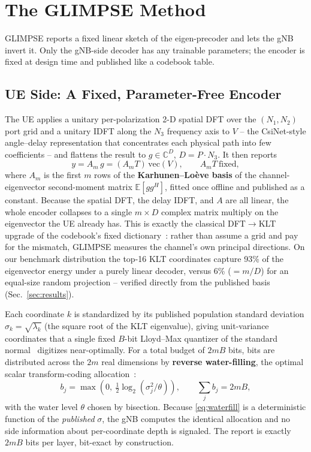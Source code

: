 \documentclass[conference]{IEEEtran}
\begin{document}
\section{The GLIMPSE Method}
GLIMPSE reports a fixed linear sketch of the eigen-precoder and lets the gNB invert it. Only the gNB-side decoder has any trainable parameters; the encoder is fixed at design time and published like a codebook table.

\subsection{UE Side: A Fixed, Parameter-Free Encoder}
The UE applies a unitary per-polarization 2-D spatial DFT over the $(N_1,N_2)$ port grid and a unitary IDFT along the $N_3$ frequency axis to $V$ -- the CsiNet-style angle--delay representation that concentrates each physical path into few coefficients -- and flattens the result to $g\in\mathbb{C}^D$, $D=P\cdot N_3$. It then reports
\begin{equation}
y = A_m\,g = (A_m T)\,\mathrm{vec}(V), \qquad A_m T\ \text{fixed},
\label{eq:report}
\end{equation}
where $A_m$ is the first $m$ rows of the \textbf{Karhunen--Lo\`{e}ve basis} of the channel-eigenvector second-moment matrix $\mathbb{E}[gg^{H}]$, fitted once offline and published as a constant. Because the spatial DFT, the delay IDFT, and $A$ are all linear, the whole encoder collapses to a single $m\times D$ complex matrix multiply on the eigenvector the UE already has. This is exactly the classical DFT$\to$KLT upgrade of the codebook's fixed dictionary~\cite{eckartyoung1936}: rather than assume a grid and pay for the mismatch, GLIMPSE measures the channel's own principal directions. On our benchmark distribution the top-16 KLT coordinates capture 93\% of the eigenvector energy under a purely linear decoder, versus 6\% ($=m/D$) for an equal-size random projection -- verified directly from the published basis (Sec.~\ref{sec:results}).

Each coordinate $k$ is standardized by its published population standard deviation $\sigma_k=\sqrt{\lambda_k}$ (the square root of the KLT eigenvalue), giving unit-variance coordinates that a single fixed $B$-bit Lloyd--Max quantizer of the standard normal~\cite{lloyd1982,max1960} digitizes near-optimally. For a total budget of $2mB$ bits, bits are distributed across the $2m$ real dimensions by \textbf{reverse water-filling}, the optimal scalar transform-coding allocation~\cite{coverthomas2006,gershogray1992}:
\begin{equation}
b_j = \max\!\left(0,\ \tfrac12\log_2(\sigma_j^2/\theta)\right), \qquad \sum_j b_j = 2mB,
\label{eq:waterfill}
\end{equation}
with the water level $\theta$ chosen by bisection. Because \eqref{eq:waterfill} is a deterministic function of the \emph{published} $\sigma$, the gNB computes the identical allocation and no side information about per-coordinate depth is signaled. The report is exactly $2mB$ bits per layer, bit-exact by construction.
\end{document}
